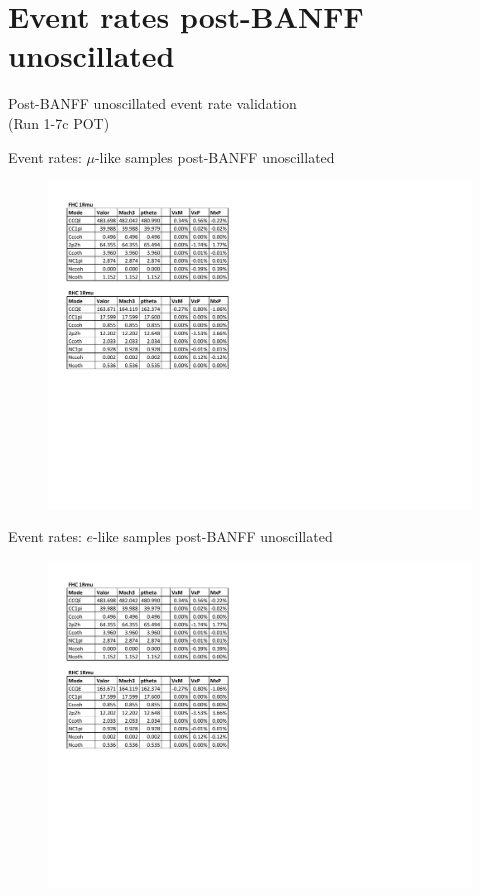 \documentclass{beamer}
\begin{document}
\section{Event rates post-BANFF unoscillated}
\begin{frame}
	\centering
	\Large Post-BANFF unoscillated event rate validation\\(Run 1-7c POT)
\end{frame}

\begin{frame}{Event rates: $\mu$-like samples post-BANFF unoscillated}
	\centering
	\begin{figure}
		\includegraphics[page=1, trim={0cm 9cm 13cm 1cm}, clip, scale=0.52] {images/rates/postfit_unosc}
	\end{figure}
\end{frame}

\begin{frame}{Event rates: $e$-like samples post-BANFF unoscillated}
	\centering
	\begin{figure}
		\includegraphics[page=2, trim={0cm 8cm 13cm 1cm}, clip, scale=0.52] {images/rates/postfit_unosc}
	\end{figure}
\end{frame}
\end{document}
